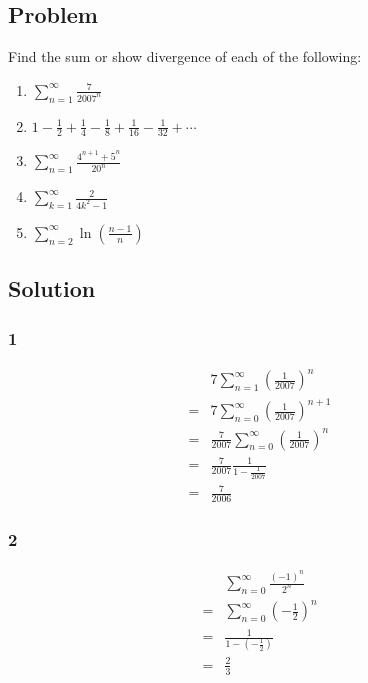 \documentclass[12pt]{article}
\newcommand{\round}[1]{\left(       #1 \right)      }
\begin{document}
\subsection*{Problem}
Find the sum or show divergence of each of the following:
\begin{enumerate}
    \item $\sum_{n = 1}^\infty \frac{7}{2007^n}$
    \item $1 - \frac{1}{2} + \frac{1}{4} - \frac{1}{8} + \frac{1}{16} - \frac{1}{32} + \cdots$
    \item $\sum_{n = 1}^\infty \frac{4^{n + 1} + 5^n}{20^n}$
    \item $\sum_{k = 1}^\infty \frac{2}{4k^2 - 1}$
    \item $\sum_{n=2}^\infty \ln\round{\frac{n-1}{n}}$
\end{enumerate}

\subsection*{Solution}

\subsubsection*{1}
\begin{align*}
     & 7 \sum_{n=1}^\infty \round{\frac{1}{2007}}^n \\
    =& 7 \sum_{n=0}^\infty \round{\frac{1}{2007}}^{n+1} \\
    =& \frac{7}{2007} \sum_{n=0}^\infty \round{\frac{1}{2007}}^n \\
    =& \frac{7}{2007} \frac{1}{1-\frac{1}{2007}} \\
    =& \frac{7}{2006}
\end{align*}

\subsubsection*{2}
\begin{align*}
     & \sum_{n=0}^\infty \frac{(-1)^n}{2^n} \\
    =& \sum_{n=0}^\infty \round{-\frac{1}{2}}^n \\
    =& \frac{1}{1 - \round{-\frac{1}{2}}} \\
    =& \frac{2}{3}
\end{align*}
\end{document}
